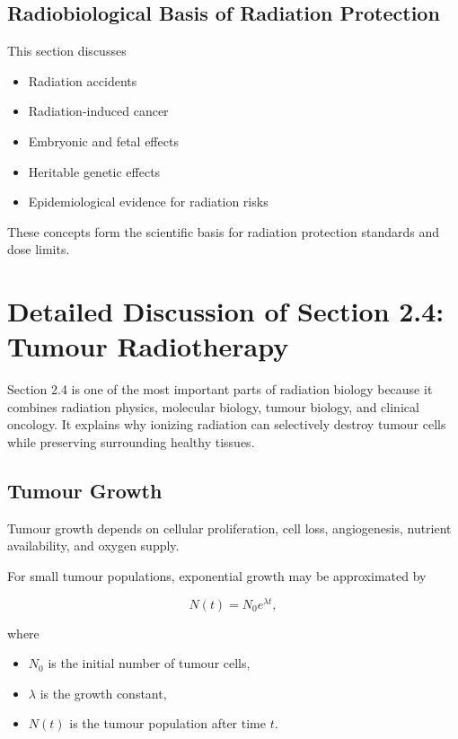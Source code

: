 \documentclass[12pt]{article}
\begin{document}
\subsection{Radiobiological Basis of Radiation Protection}

This section discusses

\begin{itemize}
\item Radiation accidents
\item Radiation-induced cancer
\item Embryonic and fetal effects
\item Heritable genetic effects
\item Epidemiological evidence for radiation risks
\end{itemize}

These concepts form the scientific basis for radiation protection standards and dose limits.


\section{Detailed Discussion of Section 2.4: Tumour Radiotherapy}

Section 2.4 is one of the most important parts of radiation biology because it combines radiation physics, molecular biology, tumour biology, and clinical oncology. It explains why ionizing radiation can selectively destroy tumour cells while preserving surrounding healthy tissues.


\subsection{Tumour Growth}

Tumour growth depends on cellular proliferation, cell loss, angiogenesis, nutrient availability, and oxygen supply.

For small tumour populations, exponential growth may be approximated by

\begin{equation}
N(t)=N_0e^{\lambda t},
\end{equation}

where

\begin{itemize}
\item $N_0$ is the initial number of tumour cells,
\item $\lambda$ is the growth constant,
\item $N(t)$ is the tumour population after time $t$.
\end{itemize}
\end{document}
